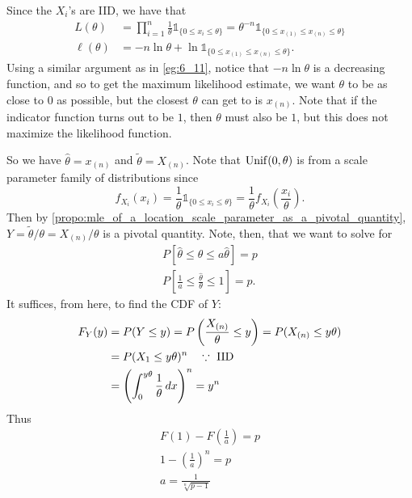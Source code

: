 \documentclass[notoc,notitlepage]{tufte-book}
\begin{document}
\begin{solution}
  Since the $X_i$'s are IID, we have that
  \begin{align*}
    L(\theta) &= \prod_{i=1}^{n} \frac{1}{\theta} \mathbb{1}_{\{0 \leq x_i \leq \theta\}} = \theta^{-n} \mathbb{1}_{\{0 \leq x_{(1)} \leq x_{(n)} \leq \theta\}} \\
    \ell(\theta) &= - n \ln \theta + \ln \mathbb{1}_{\{0 \leq x_{(1)} \leq x_{(n)} \leq \theta\}}.
  \end{align*}
  Using a similar argument as in \cref{eg:6_11}, notice that $-n \ln \theta$ is a decreasing function, and so to get the maximum likelihood estimate, we want $\theta$ to be as close to $0$ as possible, but the closest $\theta$ can get to is $x_{(n)}$. Note that if the indicator function turns out to be $1$, then $\theta$ must also be $1$, but this does not maximize the likelihood function.

  So we have $\hat{\theta} = x_{(n)}$ and $\tilde{\theta} = X_{(n)}$. Note that $\operatorname{Unif}(0, \theta)$ is from a scale parameter family of distributions since
  \begin{equation*}
    f_{X_i}(x_i) = \frac{1}{\theta} \mathbb{1}_{\{0 \leq x_i \leq \theta\}} = \frac{1}{\theta} f_{X_i}\left(\frac{x_i}{\theta}\right).
  \end{equation*}
  Then by \cref{propo:mle_of_a_location_scale_parameter_as_a_pivotal_quantity}, $Y = \tilde{\theta} / \theta = X_{(n)} / \theta$ is a pivotal quantity. Note, then, that we want to solve for
  \begin{gather*}
    P\left[ \hat{\theta} \leq \theta \leq a \hat{\theta} \right] = p \\
    P\left[ \frac{1}{a} \leq \frac{\hat{\theta}}{\theta} \leq 1 \right] = p.
  \end{gather*}
  It suffices, from here, to find the CDF of $Y$:
  \begin{align*}
    F_Y(y) &= P(Y \leq y) = P\left( \frac{X_{(n)}}{\theta} \leq y \right) = P(X_{(n)} \leq y \theta) \\
           &= P(X_1 \leq y \theta)^n \quad \because \text{ IID } \\
           &= \left( \int_{0}^{y \theta} \frac{1}{\theta} \mathop{}\!d{x} \right)^n = y^n
  \end{align*}
  Thus
  \begin{gather*}
    F(1) - F\left(\frac{1}{a}\right) = p \\
    1 - \left( \frac{1}{a} \right)^n = p \\
    a = \frac{1}{\sqrt[n]{p - 1}}
  \end{gather*}
\end{solution}
\end{document}
